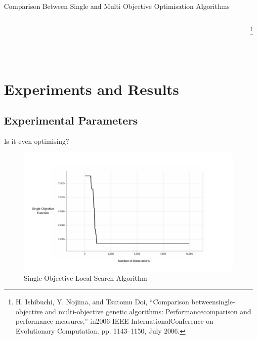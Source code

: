 \documentclass{beamer}
\begin{document}
\begin{frame}{Comparison Between Single and Multi Objective Optimisation Algorithms}
\begin{columns}
\begin{column}{0.50\textwidth}
\begin{figure}
                    \end{figure}
                \end{column}
                \footnote{H. Ishibuchi, Y. Nojima, and Tsutomu Doi, “Comparison betweensingle-objective and multi-objective genetic algorithms:  Performancecomparison and performance measures,” in2006 IEEE InternationalConference on Evolutionary Computation, pp. 1143–1150, July 2006.}
            \end{columns}\\
    
    \end{frame}

    \section{Experiments and Results}
    \subsection{Experimental Parameters}
    \begin{frame}{Is it even optimising?}
        \begin{figure}
            \centering
            \caption{Single Objective Local Search Algorithm}
            \includegraphics[width=\textwidth]{images/localsearch.png}
        \end{figure}
    \end{frame}
    
\end{document}
